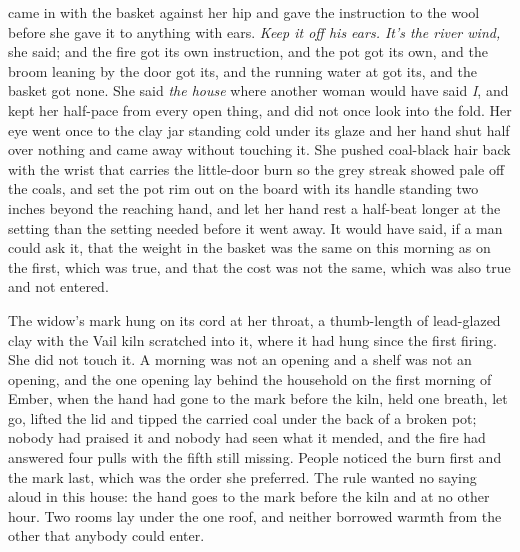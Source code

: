  came in with the basket against her hip and gave the instruction to the wool before she gave it to anything with ears. \emph{Keep it off his ears. It's the river wind,} she said; and the fire got its own instruction, and the pot got its own, and the broom leaning by the door got its, and the running water at  got its, and the basket got none. She said \emph{the house} where another woman would have said \emph{I}, and kept her half-pace from every open thing, and did not once look into the fold. Her eye went once to the clay jar standing cold under its glaze and her hand shut half over nothing and came away without touching it. She pushed coal-black hair back with the wrist that carries the little-door burn so the grey streak showed pale off the coals, and set the pot rim out on the board with its handle standing two inches beyond the reaching hand, and let her hand rest a half-beat longer at the setting than the setting needed before it went away. It would have said, if a man could ask it, that the weight in the basket was the same on this morning as on the first, which was true, and that the cost was not the same, which was also true and not entered.

The widow's mark hung on its cord at her throat, a thumb-length of lead-glazed clay with the Vail kiln scratched into it, where it had hung since the first firing. She did not touch it. A morning was not an opening and a shelf was not an opening, and the one opening lay behind the household on the first morning of Ember, when the hand had gone to the mark before the kiln, held one breath, let go, lifted the lid and tipped the carried coal under the back of a broken pot; nobody had praised it and nobody had seen what it mended, and the fire had answered four pulls with the fifth still missing. People noticed the burn first and the mark last, which was the order she preferred. The rule wanted no saying aloud in this house: the hand goes to the mark before the kiln and at no other hour. Two rooms lay under the one roof, and neither borrowed warmth from the other that anybody could enter.

\scenebreak


